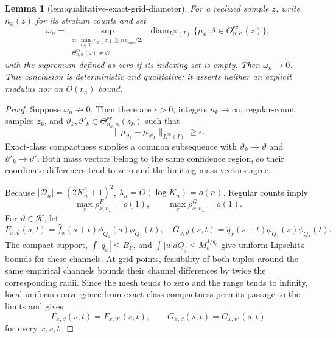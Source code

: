 \documentclass{article}
\newtheorem{lemma}{Lemma}
\begin{document}
\begin{lemma}[lem:qualitative-exact-grid-diameter]\label{lem:qualitative-exact-grid-diameter}
For a realized sample \(z\), write \(n_x(z)\) for its stratum counts and set
\[
 \omega_n=
 \sup_{\substack{z:\ \min_{x\in\mathcal X}n_x(z)\ge np_{\min}/2,\\
                  \Theta^{\mathrm{ex}}_{n,\alpha}(z)\ne\varnothing}}
 \operatorname{diam}_{L^\infty(I)}
 \{\mu_\vartheta:\vartheta\in
 \Theta^{\mathrm{ex}}_{n,\alpha}(z)\},                           \tag{1}
\]
with the supremum defined as zero if its indexing set is empty.  Then
\(\omega_n\to0\).  This conclusion is deterministic and qualitative; it
asserts neither an explicit modulus nor an \(O(r_n)\) bound.
\end{lemma}
\begin{proof}
Suppose \(\omega_n\not\to0\). Then there are \(\epsilon>0\), integers \(n_k\to\infty\), regular-count samples \(z_k\), and \(\vartheta_k,\vartheta'_k\in\Theta^{\mathrm{ex}}_{n_k,\alpha}(z_k)\) such that
\[
 \|\mu_{\vartheta_k}-\mu_{\vartheta'_k}\|_{L^\infty(I)}\ge\epsilon.
\]
Exact-class compactness supplies a common subsequence with \(\vartheta_k\to\vartheta\) and \(\vartheta'_k\to\vartheta'\). Both mass vectors belong to the same confidence region, so their coordinate differences tend to zero and the limiting mass vectors agree.

Because \(|\mathcal D_n|=(2K_n^2+1)^2\), \(\lambda_n=O(\log K_n)=o(n)\). Regular counts imply
\[
 \max_x\rho^F_{x,n_k}=o(1),
 \qquad \max_x\rho^G_{x,n_k}=o(1).
\]
For \(\vartheta\in\mathscr K\), let
\[
 F_{x,\vartheta}(s,t)=\widehat f_x(s+t)\phi_{Q_1}(s)\phi_{Q_2}(t),
 \quad
 G_{x,\vartheta}(s,t)=\widehat q_x(s+t)\phi_{Q_1}(s)\phi_{Q_2}(t).
\]
The compact support, \(\int|q_x|\le B_Y\), and \(\int|u|dQ_j\le M_e^{1/q_e}\) give uniform Lipschitz bounds for these channels. At grid points, feasibility of both tuples around the same empirical channels bounds their channel differences by twice the corresponding radii. Since the mesh tends to zero and the range tends to infinity, local uniform convergence from exact-class compactness permits passage to the limits and gives
\[
 F_{x,\vartheta}(s,t)=F_{x,\vartheta'}(s,t),
 \qquad
 G_{x,\vartheta}(s,t)=G_{x,\vartheta'}(s,t)
\]
for every \(x,s,t\).


\end{proof}
\end{document}
